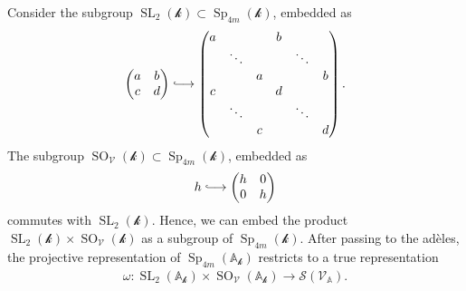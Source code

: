 \documentclass[11pt]{article} %
\newcommand{\8}{\infty}
\newcommand{\kbf}{\mathcal{k}}
\newcommand{\SO}{\operatorname{SO}}
\newcommand{\SL}{\operatorname{SL}}
\newcommand{\Sp}{\operatorname{Sp}}
\newcommand{\A}{\mathbb{A}}
\newcommand{\Scal}{\mathcal{S}}
\newcommand{\Vcal}{\mathcal{V}}
\newcommand{\hooklongrightarrow}{\lhook\joinrel\longrightarrow}
\theoremstyle{mytheoremstyle}
\theoremstyle{remark}
\numberwithin{equation}{section}
\begin{document}
\subsubsection{}Consider the subgroup $\SL_2(\kbf) \subset \Sp_{4m}(\kbf)$, embedded as
\begin{align} \label{slemb}
    \begin{pmatrix}
        a & b \\ c & d
    \end{pmatrix} \hooklongrightarrow \begin{pmatrix}
        a & & & b & & \\  & \ddots & &  & \ddots & \\  & & a &  & & b \\ c & & & d & & \\  & \ddots & &  & \ddots & \\  & & c &  & & d
    \end{pmatrix}.
    \end{align} The subgroup $\SO_{\Vcal}(\kbf) \subset \Sp_{4m}(\kbf)$, embedded as
\begin{align} \label{orthemb}
    h \hooklongrightarrow \begin{pmatrix} h & 0 \\ 0 & h
    \end{pmatrix}
    \end{align}
commutes with $\SL_2(\kbf)$. Hence, we can embed the product $\SL_2(\kbf) \times \SO_{\Vcal}(\kbf)$ as a subgroup of $\Sp_{4m}(\kbf)$. After passing to the adèles, the projective representation of $\Sp_{4m}(\A_\kbf)$ restricts to a true representation
\begin{align} \label{adelicrep}
    \omega \colon \SL_2(\A_\kbf) \times \SO_\Vcal(\A_\kbf) \longrightarrow \Scal(\Vcal_\A).
\end{align} 
\end{document}
